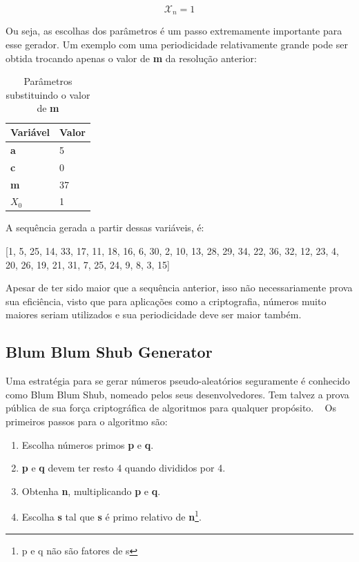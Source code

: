 \begin{equation}
	\label{Resultado do quinto valor}
	\mathcal{X}_n = 1
\end{equation}

Ou seja, as escolhas dos parâmetros é um passo extremamente importante para esse gerador. Um exemplo com uma periodicidade relativamente grande pode ser obtida trocando apenas o valor de \textbf{m} da resolução anterior:

\begin{table}[h]
	\centering
	\begin{tabular}{|l|l|}	
		\hline
		Variável & Valor \\ \hline
		\textbf{a} & 5 \\ \hline
		\textbf{c} & 0 \\ \hline
		\textbf{m} & 37 \\ \hline
		\textbf{$X_0$} & 1 \\ \hline
	\end{tabular}
	\caption{Parâmetros substituindo o valor de \textbf{m}}
\end{table}

A sequência gerada a partir dessas variáveis, é:

[1, 5, 25, 14, 33, 17, 11, 18, 16, 6, 30, 2, 10, 13, 28, 29, 34, 22, 36, 32, 12, 23, 4, 20, 26, 19, 21, 31, 7, 25, 24, 9, 8, 3, 15]

Apesar de ter sido maior que a sequência anterior, isso não necessariamente prova sua eficiência, visto que para aplicações como a criptografia, números muito maiores seriam utilizados e sua periodicidade deve ser maior também.


\subsection{Blum Blum Shub Generator}
Uma estratégia para se gerar números pseudo-aleatórios seguramente é conhecido como Blum Blum Shub, nomeado pelos seus desenvolvedores. Tem talvez a prova pública de sua força criptográfica de algoritmos para qualquer propósito. ~\cite{william-stallings} Os primeiros passos para o algoritmo são:

\begin{enumerate}
	\item Escolha números primos \textbf{p} e \textbf{q}.
	\item \textbf{p} e \textbf{q} devem ter resto 4 quando divididos por 4.
	\item Obtenha \textbf{n}, multiplicando \textbf{p} e \textbf{q}.
	\item Escolha \textbf{s} tal que \textbf{s} é primo relativo de \textbf{n}\footnote{p e q não são fatores de s}.
\end{enumerate}

